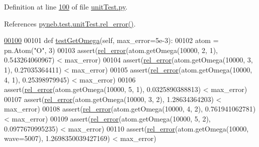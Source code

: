Definition at line \hyperlink{unit_test_8py_source_l00100}{100} of file \hyperlink{unit_test_8py_source}{unit\-Test.\-py}.



References \hyperlink{unit_test_8py_source_l00005}{pyneb.\-test.\-unit\-Test.\-rel\-\_\-error()}.


\begin{DoxyCode}
\hypertarget{classpyneb_1_1test_1_1unit_test_1_1_unit_test_l00100}{}\hyperlink{classpyneb_1_1test_1_1unit_test_1_1_unit_test_a75cb0860a7a06b129a1028ca635eacf6}{00100} 
00101         \textcolor{keyword}{def }\hyperlink{classpyneb_1_1test_1_1unit_test_1_1_unit_test_a75cb0860a7a06b129a1028ca635eacf6}{testGetOmega}(self, max\_error=5e-3):
00102                 atom = pn.Atom(\textcolor{stringliteral}{"O"}, 3)
00103                 assert(\hyperlink{namespacepyneb_1_1test_1_1unit_test_a3c7e23eb1c34daaa75eec988c96dc7b9}{rel\_error}(atom.getOmega(10000, 2, 1), 0.543264060967) < max\_error)
00104                 assert(\hyperlink{namespacepyneb_1_1test_1_1unit_test_a3c7e23eb1c34daaa75eec988c96dc7b9}{rel\_error}(atom.getOmega(10000, 3, 1), 0.27035364411) < max\_error)
00105                 assert(\hyperlink{namespacepyneb_1_1test_1_1unit_test_a3c7e23eb1c34daaa75eec988c96dc7b9}{rel\_error}(atom.getOmega(10000, 4, 1), 0.25398979945) < max\_error)
00106                 assert(\hyperlink{namespacepyneb_1_1test_1_1unit_test_a3c7e23eb1c34daaa75eec988c96dc7b9}{rel\_error}(atom.getOmega(10000, 5, 1), 0.0325890388813) < max\_error)
00107                 assert(\hyperlink{namespacepyneb_1_1test_1_1unit_test_a3c7e23eb1c34daaa75eec988c96dc7b9}{rel\_error}(atom.getOmega(10000, 3, 2), 1.28634364203) < max\_error)
00108                 assert(\hyperlink{namespacepyneb_1_1test_1_1unit_test_a3c7e23eb1c34daaa75eec988c96dc7b9}{rel\_error}(atom.getOmega(10000, 4, 2), 0.761941062781) < max\_error)
00109                 assert(\hyperlink{namespacepyneb_1_1test_1_1unit_test_a3c7e23eb1c34daaa75eec988c96dc7b9}{rel\_error}(atom.getOmega(10000, 5, 2), 0.0977670995235) < max\_error)
00110                 assert(\hyperlink{namespacepyneb_1_1test_1_1unit_test_a3c7e23eb1c34daaa75eec988c96dc7b9}{rel\_error}(atom.getOmega(10000, wave=5007), 1.2698350039427169) < max\_error)
                
\end{DoxyCode}
